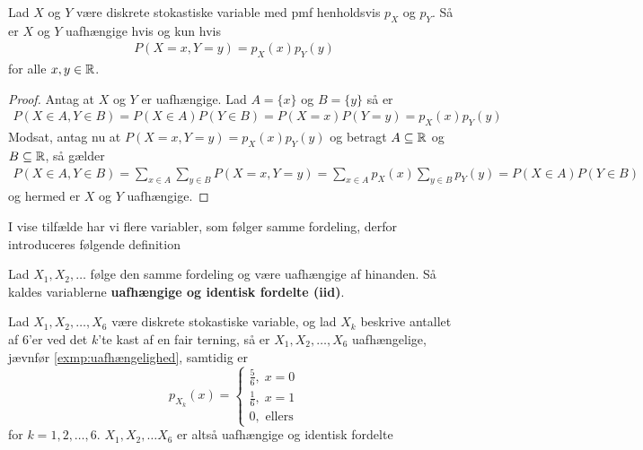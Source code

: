 \begin{prop} \label{prop:prop3.9} %
    Lad $X$ og $Y$ være diskrete stokastiske variable med pmf henholdsvis $p_X$ og $p_Y$. Så er $X$ og $Y$ uafhængige hvis og kun hvis 
    \begin{align*}
        P(X = x, Y = y)=p_X(x)p_Y(y) 
    \end{align*}
    for alle $x,y\in \mathbb{R}$.
\end{prop}
\begin{proof}
    Antag at $X$ og $Y$ er uafhængige. Lad $A=\{x \}$ og $B=\{y \}$ så er
    \begin{align*}
        P(X \in A,Y \in B)=P(X \in A)P(Y \in B)= P(X = x)P(Y = y) = p_X(x)p_Y(y)
    \end{align*}
Modsat, antag nu at $P(X = x, Y = y) = p_X(x)p_Y(y)$ og betragt $A\subseteq \mathbb{R}$ og $B\subseteq \mathbb{R}$, så gælder  
\begin{align*}
    P(X\in A, Y\in B)=\sum_{x\in A}\sum_{y\in B}P(X = x, Y =y) =\sum_{x\in A}p_X(x)\sum_{y\in B}p_Y(y)=P(X\in A)P(Y\in B)
\end{align*}
og hermed er $X$ og $Y$ uafhængige.
\end{proof}
I vise tilfælde har vi flere variabler, som følger samme fordeling, derfor introduceres følgende definition
\begin{defn} %
    Lad $X_1,X_2,\ldots$ følge den samme fordeling og være uafhængige af hinanden. Så kaldes variablerne  \textbf{uafhængige og identisk fordelte (iid)}.
\end{defn}
\begin{exmp}
    Lad $X_1, X_2, \ldots, X_6$ være diskrete stokastiske variable, og lad $X_k$ beskrive antallet af 6'er ved det $k$'te kast af en fair terning, så er $X_1, X_2, \ldots, X_6$ uafhængelige, jævnfør \ref{exmp:uafhængelighed}, samtidig er 
    \begin{equation*}
        p_{X_k}(x) = \begin{cases}
            \frac{5}{6}, \; x = 0\\
            \frac{1}{6}, \; x = 1\\
            0, \text{ ellers}
        \end{cases}
    \end{equation*} 
    for $k = 1, 2, \ldots, 6$. $X_1, X_2, \ldots X_6$ er altså uafhængige og identisk fordelte   
\end{exmp}

